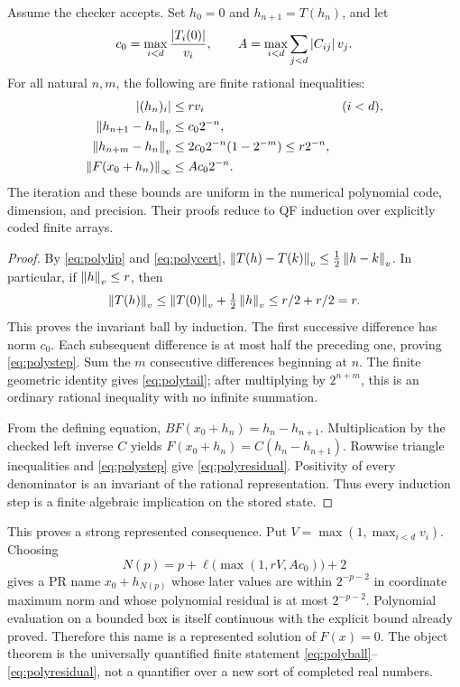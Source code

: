 \begin{theorem}\label{thm:polysolver}
Assume the checker accepts. Set \(h_0=0\) and \(h_{n+1}=T(h_n)\), and let
\[
 c_0=\max_{i<d}\frac{\left|T_i(0)\right|}{v_i},\qquad
 A=\max_{i<d}\sum_{j<d}\left|C_{ij}\right|v_j.
\]
For all natural \(n,m\), the following are finite rational inequalities:
\begin{align}
 \left|(h_n)_i\right|&\le r v_i &&(i<d),\label{eq:polyball}\\
 \left\lVert h_{n+1}-h_n\right\rVert_v&\le c_0 2^{-n},\label{eq:polystep}\\
 \left\lVert h_{n+m}-h_n\right\rVert_v&\le 2c_0 2^{-n}(1-2^{-m})\le r2^{-n},\label{eq:polytail}\\
 \left\lVert F(x_0+h_n)\right\rVert_\infty&\le A c_0 2^{-n}.\label{eq:polyresidual}
\end{align}
The iteration and these bounds are uniform in the numerical polynomial code, dimension, and precision. Their proofs reduce to QF induction over explicitly coded finite arrays.
\end{theorem}
\begin{proof}
By \eqref{eq:polylip} and \eqref{eq:polycert}, \(\left\lVert T(h)-T(k)\right\rVert_v\le\tfrac12\left\lVert h-k\right\rVert_v\). In particular, if \(\left\lVert h\right\rVert_v\le r\), then
\[
 \left\lVert T(h)\right\rVert_v\le\left\lVert T(0)\right\rVert_v+\tfrac12\left\lVert h\right\rVert_v
 \le r/2+r/2=r.
\]
This proves the invariant ball by induction. The first successive difference has norm \(c_0\). Each subsequent difference is at most half the preceding one, proving \eqref{eq:polystep}. Sum the \(m\) consecutive differences beginning at \(n\). The finite geometric identity gives \eqref{eq:polytail}; after multiplying by \(2^{n+m}\), this is an ordinary rational inequality with no infinite summation.

From the defining equation,
\(BF(x_0+h_n)=h_n-h_{n+1}\). Multiplication by the checked left inverse \(C\) yields
\(F(x_0+h_n)=C(h_n-h_{n+1})\). Rowwise triangle inequalities and \eqref{eq:polystep} give \eqref{eq:polyresidual}. Positivity of every denominator is an invariant of the rational representation. Thus every induction step is a finite algebraic implication on the stored state.
\end{proof}

This proves a strong represented consequence. Put \(V=\max(1,\max_{i<d}v_i)\). Choosing
\[
 N(p)=p+\ell\bigl(\max(1,rV,A c_0)\bigr)+2
\]
gives a PR name \(x_0+h_{N(p)}\) whose later values are within \(2^{-p-2}\) in coordinate maximum norm and whose polynomial residual is at most \(2^{-p-2}\). Polynomial evaluation on a bounded box is itself continuous with the explicit bound already proved. Therefore this name is a represented solution of \(F(x)=0\). The object theorem is the universally quantified finite statement \eqref{eq:polyball}--\eqref{eq:polyresidual}, not a quantifier over a new sort of completed real numbers.

